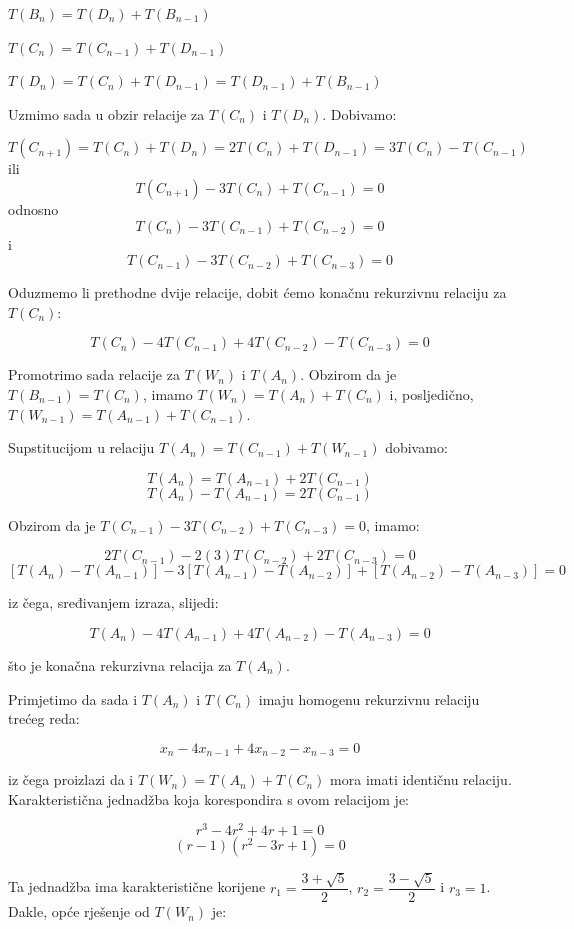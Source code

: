 \documentclass[times, utf8, zavrsni]{fer}
\begin{document}
$T(B_n) = T(D_n) + T(B_{n - 1})$

$T(C_n) = T(C_{n - 1}) + T(D_{n - 1})$

$T(D_n) = T(C_n) + T(D_{n - 1}) = T(D_{n - 1}) + T(B_{n - 1})$

Uzmimo sada u obzir relacije za $T(C_n)$ i $T(D_n)$. Dobivamo:

\[T(C_{n + 1}) = T(C_n) + T(D_n) = 2T(C_n) + T(D_{n - 1}) = 3T(C_n) - T(C_{n - 1})\]
ili 
\[T(C_{n + 1}) - 3T(C_n) + T(C_{n - 1}) = 0\]
odnosno
\[T(C_n) - 3T(C_{n - 1}) + T(C_{n - 2}) = 0\] i
\[T(C_{n-1}) - 3T(C_{n - 2}) + T(C_{n - 3}) = 0\]

Oduzmemo li prethodne dvije relacije, dobit ćemo konačnu rekurzivnu relaciju za $T(C_n)$:

\[T(C_n) - 4T(C_{n - 1}) + 4T(C_{n - 2}) - T(C_{n - 3}) = 0\]

Promotrimo sada relacije za $T(W_n)$ i $T(A_n)$. Obzirom da je $T(B_{n -1}) = T(C_n)$, imamo $T(W_n) = T(A_n) + T(C_n)$ i, posljedično, $T(W_{n - 1}) = T(A_{n - 1}) + T(C_{n - 1})$.

Supstitucijom u relaciju $T(A_n) = T(C_{n - 1}) + T(W_{n - 1})$ dobivamo:

\[T(A_n) = T(A_{n - 1}) + 2T(C_{n - 1})\]
\[T(A_n) - T(A_{n - 1}) = 2T(C_{n - 1})\]

Obzirom da je $T(C_{n - 1}) - 3T(C_{n - 2}) + T(C_{n - 3}) = 0$, imamo:

\[2T(C_{n - 1}) - 2(3)T(C_{n - 2}) + 2T(C_{n - 3}) = 0\]
\[[T(A_n) - T(A_{n - 1})] - 3[T(A_{n - 1}) - T(A_{n - 2})] + [T(A_{n - 2}) - T(A_{n - 3})] = 0\]

iz čega, sređivanjem izraza, slijedi:

\[T(A_n) - 4T(A_{n - 1}) + 4T(A_{n - 2}) - T(A_{n - 3}) = 0\]

što je konačna rekurzivna relacija za $T(A_n)$.

Primjetimo da sada i $T(A_n)$ i $T(C_n)$ imaju homogenu rekurzivnu relaciju trećeg reda:

\[x_n - 4x_{n - 1} + 4x_{n - 2} - x_{n - 3} = 0\]

iz čega proizlazi da i $T(W_n) = T(A_n) + T(C_n)$ mora imati identičnu relaciju. Karakteristična jednadžba koja korespondira s ovom relacijom je:

\[r^3 - 4r^2 + 4r + 1 = 0\]
\[(r - 1)(r^2 - 3r + 1) = 0\]

Ta jednadžba ima karakteristične korijene $r_1 = \dfrac{3 + \sqrt{5}}{2}$, $r_2 = \dfrac{3 - \sqrt{5}}{2}$ i $r_3 = 1$. Dakle, opće rješenje od $T(W_n)$ je:
\end{document}

